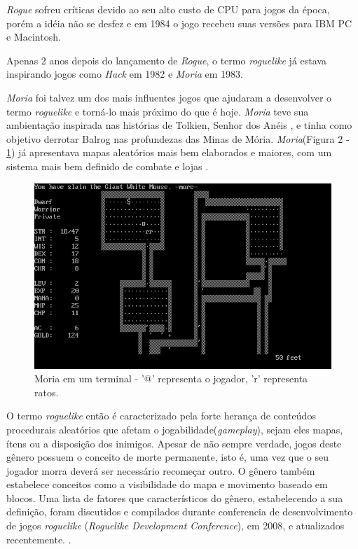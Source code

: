 \textit{Rogue} sofreu críticas devido ao seu alto custo de CPU para jogos da época, porém a idéia não se desfez e em 1984 o jogo recebeu suas versões para IBM PC e Macintosh. 


Apenas 2 anos depois do lançamento de \textit{Rogue}, o termo \textit{roguelike} já estava inspirando jogos como \textit{Hack} em 1982 e \textit{Moria} em 1983. 


\textit{Moria} foi talvez um dos mais influentes jogos que ajudaram a desenvolver o termo \textit{roguelike} e torná-lo mais próximo do que é hoje. \textit{Moria} teve sua ambientação inspirada nas histórias de Tolkien, Senhor dos Anéis \cite{tolkien}, e tinha como objetivo derrotar Balrog nas profundezas das Minas de Mória. 
\textit{Moria}(Figura 2 - \ref{fig02}) já apresentava mapas aleatórios mais bem elaborados e maiores, com um sistema mais bem definido de combate e lojas \cite{moria}. 
\begin{figure}[h]
	\centering
	\label{fig02}
		\includegraphics[keepaspectratio=true,scale=0.5]{figuras/fig02_moria.png}
	\caption{Moria em um terminal - '@' representa o jogador, 'r' representa ratos. }
\end{figure}

O termo \textit{roguelike} então é caracterizado pela forte herança de conteúdos procedurais aleatórios que afetam o jogabilidade(\textit{gameplay}), sejam eles mapas, ítens ou a disposição dos inimigos. Apesar de não sempre verdade, jogos deste gênero possuem o conceito de morte permanente, isto é, uma vez que o seu jogador morra deverá ser necessário recomeçar outro. O gênero também estabelece conceitos como a visibilidade do mapa e movimento baseado em blocos. Uma lista de fatores que característicos do gênero, estabelecendo  a sua definição, foram discutidos e compilados durante conferencia de desenvolvimento de jogos \textit{roguelike} (\textit{Roguelike Development Conference}), em 2008, e atualizados recentemente.  \cite{roguelike}.

